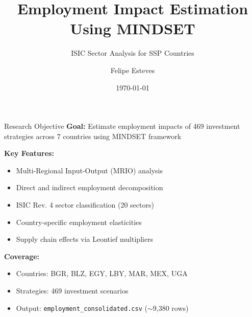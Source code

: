 \documentclass[10pt]{beamer}
\title[MINDSET Employment]{Employment Impact Estimation Using MINDSET}
\subtitle{ISIC Sector Analysis for SSP Countries}
\author{Felipe Esteves}
\institute{RAND Corporation}
\date{\today}
\begin{document}
\frame{\titlepage}


\begin{frame}{Research Objective}
\textbf{Goal:} Estimate employment impacts of 469 investment strategies across 7 countries using MINDSET framework

\vspace{0.5cm}

\textbf{Key Features:}
\begin{itemize}
    \item Multi-Regional Input-Output (MRIO) analysis
    \item Direct and indirect employment decomposition
    \item ISIC Rev. 4 sector classification (20 sectors)
    \item Country-specific employment elasticities
    \item Supply chain effects via Leontief multipliers
\end{itemize}

\vspace{0.5cm}

\textbf{Coverage:}
\begin{itemize}
    \item Countries: BGR, BLZ, EGY, LBY, MAR, MEX, UGA
    \item Strategies: 469 investment scenarios
    \item Output: \texttt{employment\_consolidated.csv} ($\sim$9,380 rows)
\end{itemize}
\end{frame}

\end{document}
